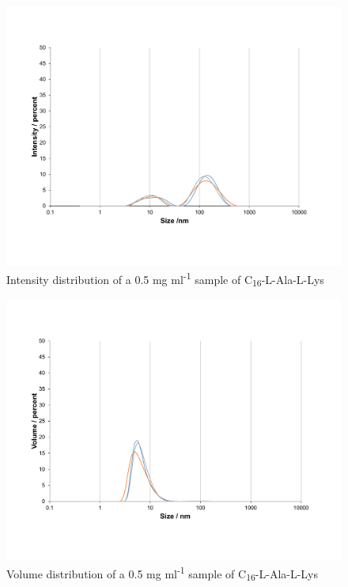 \begin{figure} [ht!]
\centering
\includegraphics[scale=0.47]{DLS/KAT1_19_0_5mg_ml-1_size.pdf}
\caption{Intensity distribution of a 0.5 mg ml\textsuperscript{-1} sample of C\textsubscript{16}-L-Ala-L-Lys}
\label{intensity_0.5_KAT1.19}
\end{figure}
\begin{figure} [ht!]
\centering
\includegraphics[scale=0.47]{DLS/KAT1_19_0_5mg_ml-1_volume.pdf}
\caption{Volume distribution of a 0.5 mg ml\textsuperscript{-1} sample of C\textsubscript{16}-L-Ala-L-Lys}
\label{volume_0.5_KAT1.19}
\end{figure}


